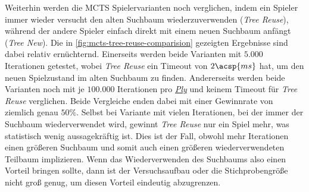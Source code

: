 Weiterhin werden die \ac{MCTS} Spielervarianten noch verglichen, indem ein Spieler immer wieder versucht den alten Suchbaum wiederzuverwenden (\emph{Tree Reuse}), während der andere Spieler einfach direkt mit einem neuen Suchbaum anfängt (\emph{Tree New}). Die in \ref{fig:mcts-tree-reuse-comparision} gezeigten Ergebnisse sind dabei relativ ernüchternd. Einerseits werden beide Varianten mit $5{.}000$ Iterationen getestet, wobei \emph{Tree Reuse} ein Timeout von $2\acsp{ms}$ hat, um den neuen Spielzustand im alten Suchbaum zu finden. Andererseits werden beide Varianten noch mit je $100{.}000$ Iterationen pro \hyperref[text:ply]{\emph{Ply}} und keinem Timeout für \emph{Tree Reuse} verglichen. Beide Vergleiche enden dabei mit einer Gewinnrate von ziemlich genau $50\%$. Selbst bei Variante mit vielen Iterationen, bei der immer der Suchbaum wiederverwendet wird, gewinnt \emph{Tree Reuse} nur ein Spiel mehr, was statistisch wenig aussagekräftig ist. Dies ist der Fall, obwohl mehr Iterationen einen größeren Suchbaum und somit auch einen größeren wiederverwendeten Teilbaum implizieren. Wenn das Wiederverwenden des Suchbaums also einen Vorteil bringen sollte, dann ist der Versuchsaufbau oder die Stichprobengröße nicht groß genug, um diesen Vorteil eindeutig abzugrenzen.

